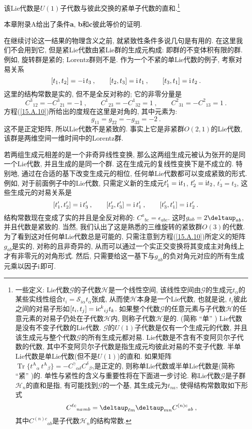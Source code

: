  该Lie代数是$U(1)$子代数与彼此交换的紧单子代数的直和.\footnote{一些定义: 
Lie代数$\mathscr{G}$的子代数$\mathscr{H}$是一个线性空间, 该线性空间由$\mathscr{G}$的生成元$t_{\alpha}$的某些实线性组合$t_{i}=\mathscr{S}_{i\alpha
}t_{\alpha }$张成, 从而使$\mathscr{H}$本身是一个Lie代数, 也就是说, $t_{i}$彼此之间的对易子形如$[t_{i},t_{j}]=\mathrm{i} c^{k}{}_{ij}t_{k}$. 
如果整个代数$\mathscr{G}$的任意元素与子代数$\mathscr{H}$的任意元素的对易子仍处在子代数$\mathscr{H}$内, 则称子代数$\mathscr{H}$是{}的. %
{}(简称 ``单'' ) Lie代数是没有不变子代数的Lie代数. $\mathscr{G}$的$U(1)$子代数是仅有一个生成元的代数, 
并且该生成元与整个代数$\mathscr{G}$的所有生成元都对易. {}Lie代数是不含有不变阿贝尔子代数的代数, 其中不变阿贝尔子代数是指生成元均彼此对易的不变子代数.
半单Lie代数是单Lie代数(但不是$U(1)$)的直和. 如果矩阵$\operatorname{Tr}\{t^{\text{A}}{}_{\alpha}\,%
t^{\text{A}}{}_{\beta}\}=-C^{\gamma}{}_{\alpha\delta}C^{\delta}{}_{\beta%
\gamma}$是正定的, 则称单Lie代数或半单Lie代数是{}(简称 ``紧'' )的. 单性与紧性的含义与重要性将在下面进一步讨论. 
称Lie代数$\mathscr{G}$是子群$\mathscr{H}_{n}$的直和是指, 有可能找到$\mathscr{G}$的一个基, 其生成元为$t_{na}$, 使得结构常数取如下形式
\[
C^{\ell c}{}_{na}{}_{mb}=\deltaup_{\ell m}\deltaup_{mn}C^{(n)c}{}_{ab}\:, 
\]%
其中$C^{(n)c}{}_{ab}$是子代数$\mathscr{H}%
_{n}$的结构常数.}

\noindent 本章附录A给出了条件{\bf{a}}, {\bf{b}}和{\bf{c}}彼此等价的证明.\cite{7}

在继续讨论这一结果的物理含义之前, 就紧致性条件多说几句是有用的. 在这里我们不会用到它, 但是紧Lie代数由紧Lie群的生成元构成: 即群的不变体积有限的群. 
例如, 旋转群是紧的; Lorentz群则不是. 作为一个不紧的单Lie代数的例子, 考察对易关系
\[
[t_{1},t_{2}]=-\mathrm{i}\,t_{3}\:, \qquad [t_{2},t_{3}]=\mathrm{i}\,t_{1} \:,\qquad [t_{3},t_{1}]=\mathrm{i}\,t_{2}\:. 
\]%
这里的结构常数是实的, 但不是全反对称的; 它的非零分量是
\[
C^{3}{}_{12}=-C^{3}{}_{21}=-1\:, \qquad C^{1}{}_{23}=-C^{1}{}_{32}=1 \:, \qquad C^{2}{}_{31}=-C^{2}{}_{13}=1\:. 
\]%
方程(\ref{15.A.10})所给出的度规在这里是对角的, 其中元素为:%
\[
g_{11}=g_{22}=-g_{33}=-2\:. 
\]%
这不是正定矩阵, 所以Lie代数不是紧致的. 事实上它是非紧群$O(2,1)$的Lie代数, 该群是两维空间一维时间中的Lorentz群.

若两组生成元相差的是一个非奇异{}线性变换, 那么这两组生成元被认为张开的是同一个Lie代数, 并且生成的是同一个群. 
这在生成元的复线性变换下是不成立的. 特别地, 通过在合适的基下改变生成元的相位, 任何单Lie代数都可以变成紧致的形式. 例如, 对于前面例子中的Lie代数,
只需定义新的生成元$%
t_{1}^{\prime }=\mi t_{1}$, $t_{2}^{\prime }=\mathrm{i} t_{2}$, $t_{3}^{\prime }=t_{3}$,
这些生成元的对易关系是
\[
[t_{1}^{\prime },t_{2}^{\prime }]=\mathrm{i}\,t_{3}^{\prime} \:, \qquad 
[t_{2}^{\prime },t_{3}^{\prime }]=\mathrm{i}\,t_{1}^{\prime}\:, \qquad 
[t_{3}^{\prime },t_{1}^{\prime }]=\mathrm{i}\,t_{2}^{\prime }\:. 
\]%
结构常数现在变成了实的并且是全反对称的: $C^{a}{}_{bc}=\epsilon _{abc}$. 这时$g_{ab}=2\deltaup_{ab}$, 并且代数是紧致的. 
当然, 我们认出了这是熟悉的三维旋转的紧致群$O(3)$的代数. 为了看到这对任何单Lie代数总是可能的, 
只需注意到方程(\ref{15.A.10})所定义的矩阵$g_{a b}$是实的, 对称的且非奇异的, 
从而可以通过一个实正交变换将其变成主对角线上才有非零元的对角形式. 然后, 只需要给这一基下与$g_{ab}$的负对角元对应的所有生成元乘以因子$\mathrm{i}$即可.


